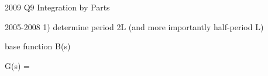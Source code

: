 
2009 Q9 Integration by Parts

2005-2008 
1) determine period 2L (and more importantly half-period L)




base function B(s)

G(s)  = 
